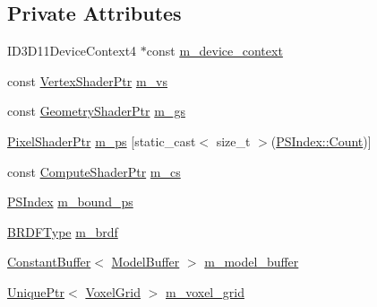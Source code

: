 \subsection*{Private Attributes}
\begin{DoxyCompactItemize}
\item 
I\+D3\+D11\+Device\+Context4 $\ast$const \hyperlink{classmage_1_1_voxelization_pass_ae7f5f5ea9045f546d2b274336a031b6a}{m\+\_\+device\+\_\+context}
\item 
const \hyperlink{namespacemage_a1f19b094f771e30bc0a6c1cebcc0dd58}{Vertex\+Shader\+Ptr} \hyperlink{classmage_1_1_voxelization_pass_a228d6cbcd1ed2948ffba87b2461beca6}{m\+\_\+vs}
\item 
const \hyperlink{namespacemage_acc49e8e93ccc87613b02dd688f0db21a}{Geometry\+Shader\+Ptr} \hyperlink{classmage_1_1_voxelization_pass_aaf6915c46f6a550d494501ded0a44651}{m\+\_\+gs}
\item 
\hyperlink{namespacemage_acbec875bb5e5e085e32ed244a24d2b6f}{Pixel\+Shader\+Ptr} \hyperlink{classmage_1_1_voxelization_pass_aa0afe7d2b344249c513af0706ad8b22b}{m\+\_\+ps} \mbox{[}static\+\_\+cast$<$ size\+\_\+t $>$(\hyperlink{classmage_1_1_voxelization_pass_a3632bab7b0039dbbe10569618ae57589ae93f994f01c537c4e2f7d8528c3eb5e9}{P\+S\+Index\+::\+Count})\mbox{]}
\item 
const \hyperlink{namespacemage_a95ee75d4d07106395d80f751d364dc1b}{Compute\+Shader\+Ptr} \hyperlink{classmage_1_1_voxelization_pass_a7742451b2503ef5208fc286dd32a6d9b}{m\+\_\+cs}
\item 
\hyperlink{classmage_1_1_voxelization_pass_a3632bab7b0039dbbe10569618ae57589}{P\+S\+Index} \hyperlink{classmage_1_1_voxelization_pass_ab00023b5a819f5d42134308dfbd1c012}{m\+\_\+bound\+\_\+ps}
\item 
\hyperlink{namespacemage_af1044f87544bc38427766a8c795d2f26}{B\+R\+D\+F\+Type} \hyperlink{classmage_1_1_voxelization_pass_a35943c47608768e49227d3f6bf8b4996}{m\+\_\+brdf}
\item 
\hyperlink{classmage_1_1_constant_buffer}{Constant\+Buffer}$<$ \hyperlink{structmage_1_1_model_buffer}{Model\+Buffer} $>$ \hyperlink{classmage_1_1_voxelization_pass_abc2abb38c64a8f6cf3a24934e9864860}{m\+\_\+model\+\_\+buffer}
\item 
\hyperlink{namespacemage_a3316d7143a973e37adf1110f2e80ca31}{Unique\+Ptr}$<$ \hyperlink{classmage_1_1_voxel_grid}{Voxel\+Grid} $>$ \hyperlink{classmage_1_1_voxelization_pass_a22b05bbc3e203b37c3cd30a3509e334f}{m\+\_\+voxel\+\_\+grid}
\end{DoxyCompactItemize}


